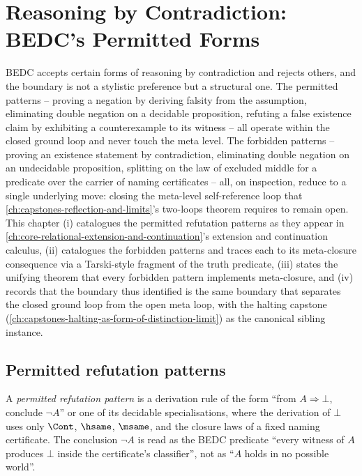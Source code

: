 \chapter{Reasoning by Contradiction: BEDC's Permitted Forms}
\label{ch:capstones-reasoning-by-contradiction-boundary}

BEDC accepts certain forms of reasoning by contradiction and rejects others, and the boundary is not a stylistic preference but a structural one. The permitted patterns -- proving a negation by deriving falsity from the assumption, eliminating double negation on a decidable proposition, refuting a false existence claim by exhibiting a counterexample to its witness -- all operate within the closed ground loop and never touch the meta level. The forbidden patterns -- proving an existence statement by contradiction, eliminating double negation on an undecidable proposition, splitting on the law of excluded middle for a predicate over the carrier of naming certificates -- all, on inspection, reduce to a single underlying move: closing the meta-level self-reference loop that \autoref{ch:capstones-reflection-and-limits}'s two-loops theorem requires to remain open. This chapter (i) catalogues the permitted refutation patterns as they appear in \autoref{ch:core-relational-extension-and-continuation}'s extension and continuation calculus, (ii) catalogues the forbidden patterns and traces each to its meta-closure consequence via a Tarski-style fragment of the truth predicate, (iii) states the unifying theorem that every forbidden pattern implements meta-closure, and (iv) records that the boundary thus identified is the same boundary that separates the closed ground loop from the open meta loop, with the halting capstone (\autoref{ch:capstones-halting-as-form-of-distinction-limit}) as the canonical sibling instance.

\section{Permitted refutation patterns}
\label{sec:reasoning-by-contradiction-permitted}

\begin{definition}
\label{def:reasoning-permitted-pattern}
A \emph{permitted refutation pattern} is a derivation rule of the form ``from $A \Rightarrow \bot$, conclude $\neg A$'' or one of its decidable specialisations, where the derivation of $\bot$ uses only $\Cont$, $\hsame$, $\msame$, and the closure laws of a fixed naming certificate. The conclusion $\neg A$ is read as the BEDC predicate ``every witness of $A$ produces $\bot$ inside the certificate's classifier'', not as ``$A$ holds in no possible world''.
\end{definition}


